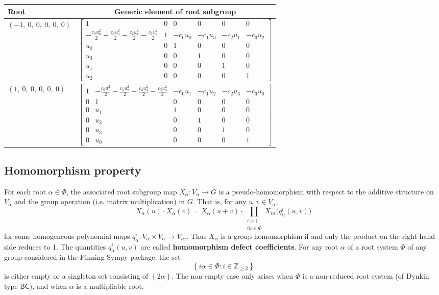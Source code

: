 \documentclass[11pt]{article}
\newcommand{\noi}{\noindent}
\newcommand{\tbf}{\textbf}
\newcommand{\lb}{\left\{}
\newcommand{\rb}{\right\}}
\newcommand{\Z}{\mathbb{Z}}
\theoremstyle{definition}
\begin{document}
\noindent \begin{longtable}{|l|c|}
    \hline
    \textbf{Root} & \textbf{Generic element of root subgroup} \\
    \hline
    \endhead
    $\left( -1, \  0, \  0, \  0, \  0, \  0\right)$ & ${\left[\begin{matrix}1 & 0 & 0 & 0 & 0 & 0\\- \frac{c_{0} u_{0}^{2}}{2} - \frac{c_{1} u_{3}^{2}}{2} - \frac{c_{2} u_{1}^{2}}{2} - \frac{c_{3} u_{2}^{2}}{2} & 1 & - c_{0} u_{0} & - c_{1} u_{3} & - c_{2} u_{1} & - c_{3} u_{2}\\u_{0} & 0 & 1 & 0 & 0 & 0\\u_{3} & 0 & 0 & 1 & 0 & 0\\u_{1} & 0 & 0 & 0 & 1 & 0\\u_{2} & 0 & 0 & 0 & 0 & 1\end{matrix}\right]}$ \\
    \hline
    $\left( 1, \  0, \  0, \  0, \  0, \  0\right)$ & ${\left[\begin{matrix}1 & - \frac{c_{0} u_{1}^{2}}{2} - \frac{c_{1} u_{2}^{2}}{2} - \frac{c_{2} u_{3}^{2}}{2} - \frac{c_{3} u_{0}^{2}}{2} & - c_{0} u_{1} & - c_{1} u_{2} & - c_{2} u_{3} & - c_{3} u_{0}\\0 & 1 & 0 & 0 & 0 & 0\\0 & u_{1} & 1 & 0 & 0 & 0\\0 & u_{2} & 0 & 1 & 0 & 0\\0 & u_{3} & 0 & 0 & 1 & 0\\0 & u_{0} & 0 & 0 & 0 & 1\end{matrix}\right]}$ \\
    \hline
\end{longtable}


\subsection{Homomorphism property}

\noi For each root $\alpha \in \Phi$, the associated root subgroup map $X_\alpha:V_\alpha \to G$ is a pseudo-homomorphism with respect to the additive structure on $V_\alpha$ and the group operation (i.e. matrix multiplication) in $G$. That is, for any $u,v \in V_\alpha$,
\begin{equation}
\label{pseudo homomorphism}
	X_\alpha(u) \cdot X_\alpha(v) = X_\alpha(u+v) \cdot \prod_{\substack{i > 1 \\ i \alpha \in \Phi}} X_{i \alpha} \Big( q^i_\alpha(u,v) \Big)
\end{equation}
for some homogeneous polynomial maps $q^i_\alpha:V_\alpha \times V_\alpha \to V_{i \alpha}$. Thus $X_\alpha$ is a group homomorphism if and only the product on the right hand side reduces to 1. The quantities $q^i_\alpha(u,v)$ are called \tbf{homomorphism defect coefficients}. For any root $\alpha$ of a root system $\Phi$ of any group considered in the Pinning-Sympy package, the set
\[
	\lb i \alpha \in \Phi : i \in \Z_{\ge 2} \rb
\]
is either empty or a singleton set consisting of $\lb 2 \alpha \rb$. The non-empty case only arises when $\Phi$ is a non-reduced root system (of Dynkin type $\mathsf{BC}$), and when $\alpha$ is a multipliable root. 
\end{document}
